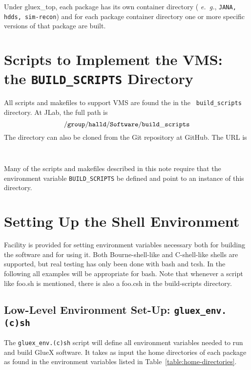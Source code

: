 \documentclass[12pt]{article}
\begin{document}
Under gluex\_top, each package has its own container directory ({\it
  e.~g.}, {\tt JANA, hdds, sim-recon}) and for each package container
directory one or more specific versions of that package are built.

\section{Scripts to Implement the VMS: \\ the {\tt BUILD\_SCRIPTS} Directory}

All scripts and makefiles to support VMS are found the in the {\tt
  build\_scripts} directory. At JLab, the full path is
$${\tt /group/halld/Software/build\_scripts}$$
The directory can also be cloned from the Git repository at GitHub. The URL is
\begin{center}\tt 
\end{center}
Many of the scripts and makefiles described in this note require that
the environment variable {\tt BUILD\_SCRIPTS} be defined and point to
an instance of this directory.

\section{Setting Up the Shell Environment}

Facility is provided for setting environment variables necessary both
for building the software and for using it. Both Bourne-shell-like and
C-shell-like shells are supported, but real testing has only been done
with bash and tcsh. In the following all examples will be appropriate
for bash. Note that whenever a script like foo.sh is mentioned, there
is also a foo.csh in the build-scripts directory.

\subsection{Low-Level Environment Set-Up: {\tt gluex\_env.(c)sh}}
\label{section:low-level-environment-setting}

The {\tt gluex\_env.(c)sh} script will define all environment
variables needed to run and build GlueX software. It takes as input
the home directories of each package as found in the environment
variables listed in Table~\ref{table:home-directories}.
\end{document}
